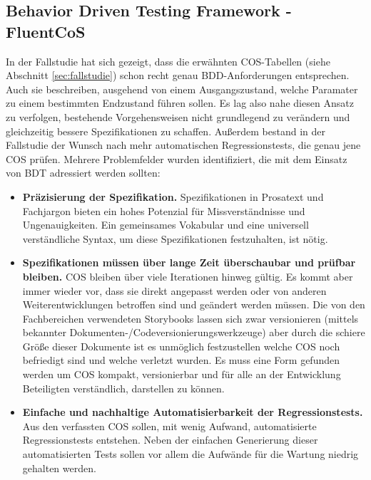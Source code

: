 \subsection{Behavior Driven Testing Framework - FluentCoS}
\label{sec:fluent_cos}
In der Fallstudie hat sich gezeigt, dass die erwähnten \Gls{COS}-Tabellen (siehe Abschnitt \ref{sec:fallstudie}) schon recht genau \Gls{BDD}-Anforderungen entsprechen. Auch sie beschreiben, ausgehend von einem Ausgangszustand, welche Paramater zu einem bestimmten Endzustand führen sollen. Es lag also nahe diesen Ansatz zu verfolgen, bestehende Vorgehensweisen nicht grundlegend zu verändern und gleichzeitig bessere Spezifikationen zu schaffen. Außerdem bestand in der Fallstudie der Wunsch nach mehr automatischen Regressionstests, die genau jene \Gls{COS} prüfen. Mehrere Problemfelder wurden identifiziert, die mit dem Einsatz von \Gls{BDT} adressiert werden sollten:

\begin{itemize}
\item \textbf{Präzisierung der Spezifikation.} Spezifikationen in Prosatext und Fachjargon bieten ein hohes Potenzial für Missverständnisse und Ungenauigkeiten. Ein gemeinsames Vokabular und eine universell verständliche Syntax, um diese Spezifikationen festzuhalten, ist nötig.
\item \textbf{Spezifikationen müssen über lange Zeit überschaubar und prüfbar bleiben.} \Gls{COS} bleiben über viele Iterationen hinweg gültig. Es kommt aber immer wieder vor, dass sie direkt angepasst werden oder von anderen Weiterentwicklungen betroffen sind und geändert werden müssen. Die von den Fachbereichen verwendeten Storybooks lassen sich zwar versionieren (mittels bekannter Dokumenten-/Codeversionierungswerkzeuge) aber durch die schiere Größe dieser Dokumente ist es unmöglich festzustellen welche \Gls{COS} noch befriedigt sind und welche verletzt wurden. Es muss eine Form gefunden werden um \Gls{COS} kompakt, versionierbar und für alle an der Entwicklung Beteiligten verständlich, darstellen zu können.
\item \textbf{Einfache und nachhaltige Automatisierbarkeit der Regressionstests.} Aus den verfassten \Gls{COS} sollen, mit wenig Aufwand, automatisierte Regressionstests entstehen. Neben der einfachen Generierung dieser automatisierten Tests sollen vor allem die Aufwände für die Wartung niedrig gehalten werden.
\end{itemize}

